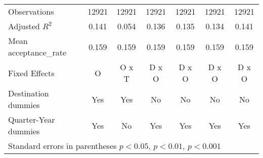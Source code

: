 \begin{table}[!ht]
\begin{tabular}{l*{6}{c}}
\hline
Observations        &       12921         &       12921         &       12921         &       12921         &       12921         &       12921         \\
Adjusted \(R^{2}\)  &       0.141         &       0.054         &       0.136         &       0.135         &       0.134         &       0.141         \\
Mean acceptance\_rate&       0.159         &       0.159         &       0.159         &       0.159         &       0.159         &       0.159         \\
Fixed Effects       &           O         &       O x T         &       D x O         &       D x O         &       D x O         &       D x O         \\
Destination dummies &         Yes         &         Yes         &          No         &          No         &          No         &          No         \\
Quarter-Year dummies&         Yes         &          No         &         Yes         &         Yes         &         Yes         &         Yes         \\
\hline\hline
\multicolumn{7}{l}{ Standard errors in parentheses \sym{*} \(p<0.05\), \sym{**} \(p<0.01\), \sym{***} \(p<0.001\)}\\
\end{tabular}
\end{table}
